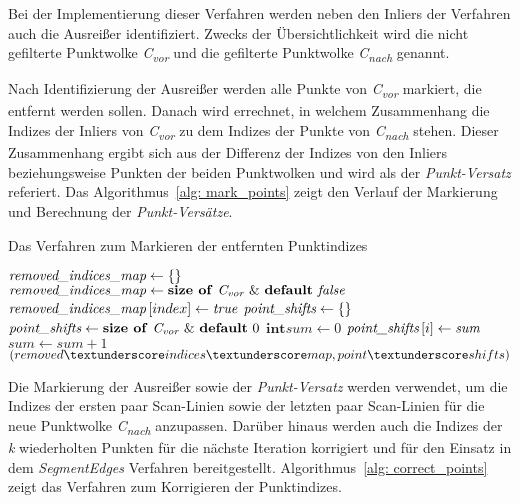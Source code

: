 Bei der Implementierung dieser Verfahren werden neben den Inliers der Verfahren auch die Ausreißer identifiziert. Zwecks der Übersichtlichkeit wird die nicht gefilterte Punktwolke \textit{C\textsubscript{vor}} und die gefilterte Punktwolke \textit{C\textsubscript{nach}} genannt. 

Nach Identifizierung der Ausreißer werden alle Punkte von \textit{C\textsubscript{vor}} markiert, die entfernt werden sollen. Danach wird errechnet, in welchem Zusammenhang die Indizes der Inliers von \textit{C\textsubscript{vor}} zu dem Indizes der Punkte von \textit{C\textsubscript{nach}} stehen. Dieser Zusammenhang ergibt sich aus der Differenz der Indizes von den Inliers beziehungsweise Punkten der beiden Punktwolken und wird als der \textit{Punkt-Versatz} referiert. Das Algorithmus~\ref{alg: mark_points} zeigt den Verlauf der Markierung und Berechnung der \textit{Punkt-Versätze}. 

\begin{algorithm}[!b]
	\caption{Das Verfahren zum Markieren der entfernten Punktindizes}
	\label{alg: mark_points}
	\begin{algorithmic}[1]
		\State $\textit{removed\textunderscore indices\textunderscore map} \gets \text{\{\}}$
		\State $\textit{removed\textunderscore indices\textunderscore map} \gets \text{\textbf{size of} \textit{C\textsubscript{vor}} \& \textbf{default} \textit{false}}$
		\State $\textit{removed\textunderscore indices\textunderscore map} \left[index\right] \gets \textit{true}$
		\EndFor
		\State $\textit{point\textunderscore shifts} \gets \text{\{\}}$
		\State $\textit{point\textunderscore shifts} \gets \text{\textbf{size of} \textit{C\textsubscript{vor}} \& \textbf{default} 0}$
		\State $\textbf{int} \textit{sum} \gets 0$
		\State $\textit{point\textunderscore shifts}\left[i\right] \gets \textit{sum}$
		\Else
		\State $\textit{sum} \gets \textit{sum} + 1$
		\EndIf
		\EndFor
		\Return $(removed\textunderscore indices\textunderscore map, point\textunderscore shifts)$
		\EndFunction
	\end{algorithmic}
\end{algorithm}

Die Markierung der Ausreißer sowie der \textit{Punkt-Versatz} werden verwendet, um die Indizes der ersten paar Scan-Linien sowie der letzten paar Scan-Linien für die neue Punktwolke \textit{C\textsubscript{nach}} anzupassen. Darüber hinaus werden auch die Indizes der \textit{k} wiederholten Punkten für die nächste Iteration korrigiert und für den Einsatz in dem \textit{SegmentEdges} Verfahren bereitgestellt. Algorithmus~\ref{alg: correct_points} zeigt das Verfahren zum Korrigieren der Punktindizes.

